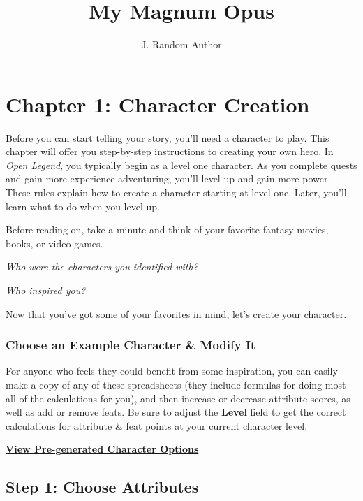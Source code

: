 \documentclass[12pt]{report}
\title{My Magnum Opus}
\author{J. Random Author}
\date{}
\begin{document}
\maketitle
{
\hypersetup{linkcolor=black}
\setcounter{tocdepth}{2}
\tableofcontents
}
\chapter{Chapter 1: Character
Creation}\label{chapter-1-character-creation}

Before you can start telling your story, you'll need a character to
play. This chapter will offer you step-by-step instructions to creating
your own hero. In \emph{Open Legend}, you typically begin as a level one
character. As you complete quests and gain more experience adventuring,
you'll level up and gain more power. These rules explain how to create a
character starting at level one. Later, you'll learn what to do when you
level up.

Before reading on, take a minute and think of your favorite fantasy
movies, books, or video games.

\emph{Who were the characters you identified with?}

\emph{Who inspired you?}

Now that you've got some of your favorites in mind, let's create your
character.

\subsection{Choose an Example Character \& Modify
It}\label{choose-an-example-character-modify-it}

For anyone who feels they could benefit from some inspiration, you can
easily make a copy of any of these spreadsheets (they include formulas
for doing most all of the calculations for you), and then increase or
decrease attribute scores, as well as add or remove feats. Be sure to
adjust the \textbf{Level} field to get the correct calculations for
attribute \& feat points at your current character level.

\href{https://drive.google.com/drive/u/0/folders/0Bx_UrXHMi3wmUlJjbDZiaGtIX00}{\textbf{View
Pre-generated Character Options}}

\section{Step 1: Choose Attributes}\label{step-1-choose-attributes}
\end{document}
